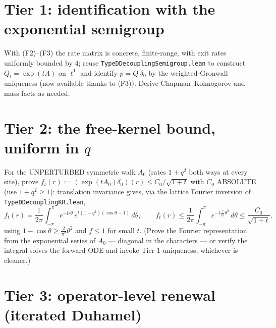 \documentclass[11pt]{article}
\theoremstyle{plain}
\theoremstyle{remark}
\begin{document}
\section*{Tier 1: identification with the exponential semigroup}

With (F2)--(F3) the rate matrix is concrete, finite-range, with exit rates
uniformly bounded by $4$; reuse \texttt{TypeDDecouplingSemigroup.lean} to
construct $Q_t=\exp(tA)$ on $\ell^1$ and identify $p=Q_\cdot\delta_0$ by the
weighted-Gronwall uniqueness (now available thanks to (F3)). Derive
Chapman--Kolmogorov and mass facts as needed.

\section*{Tier 2: the free-kernel bound, uniform in $q$}

For the UNPERTURBED symmetric walk $A_0$ (rates $1+q^2$ both ways at every
site), prove $f_t(r):=(\exp(tA_0)\delta_0)(r)\le C_0/\sqrt{1+t}$ with $C_0$
ABSOLUTE (use $1+q^2\ge1$): translation invariance gives, via the lattice
Fourier inversion of \texttt{TypeDDecouplingKR.lean},
\[
  f_t(r)=\frac1{2\pi}\int_{-\pi}^{\pi}e^{-\mathrm ir\theta}
  \,e^{t(1+q^2)(\cos\theta-1)}\,d\theta,\qquad
  f_t(r)\le\frac1{2\pi}\int_{-\pi}^{\pi}e^{-t\frac2{\pi^2}\theta^2}\,d\theta
  \le\frac{C_0}{\sqrt{1+t}} ,
\]
using $1-\cos\theta\ge\tfrac2{\pi^2}\theta^2$ and $f\le1$ for small $t$.
(Prove the Fourier representation from the exponential series of $A_0$ ---
diagonal in the characters --- or verify the integral solves the forward ODE
and invoke Tier-1 uniqueness, whichever is cleaner.)

\section*{Tier 3: operator-level renewal (iterated Duhamel)}
\end{document}
